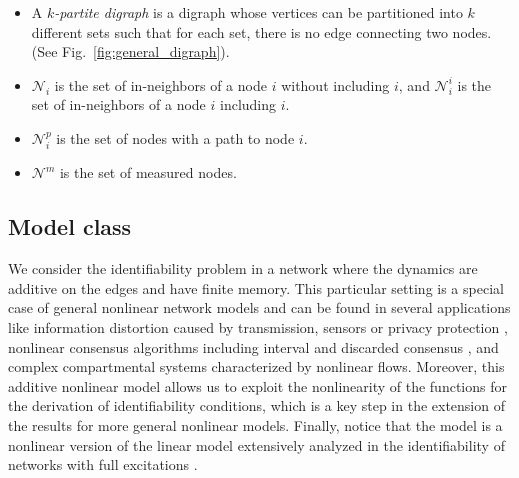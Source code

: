 \documentclass[letterpaper,10pt,journal]{IEEEtran}
\newcommand{\NN}{\mathcal{N}}
\begin{document}
\begin{itemize}
    \item A \emph{$k$-partite digraph} is a digraph whose vertices can be partitioned into $k$ different sets such that for each set, there is no edge connecting two nodes. (See Fig.~\ref{fig:general_digraph}).
    \item $\NN_i$ is the set of in-neighbors of a node $i$ without including $i$, and $\NN_i^i$ is the set of in-neighbors of a node $i$ \linebreak including $i$.
    \item $\NN_i^p$ is the set of nodes with a path to node $i$.
    \item $\NN^m$ is the set of measured nodes.
\end{itemize}



\subsection{Model class}\label{sec:model_class}


We consider the identifiability problem in a network where the dynamics are additive on the edges and have finite memory. This particular setting is a special case of general nonlinear network models \cite{zanudo2017structure} and can be found in several applications like information distortion caused by transmission, sensors or privacy protection \cite{wang2022transmission}, nonlinear consensus algorithms including interval \cite{fontan2020interval} and  discarded consensus \cite{liu2012discarded}, and complex compartmental systems characterized by nonlinear flows. Moreover, this additive nonlinear model allows us to exploit the nonlinearity of the functions for the derivation of identifiability conditions, which is a key step in the extension of the results for more general nonlinear models. Finally, notice that the model is a nonlinear version of the linear model extensively analyzed in the identifiability of networks with full excitations \cite{weerts2018identifiability,hendrickx2019identifiability,vanwaarde2020necessary}.
\end{document}
